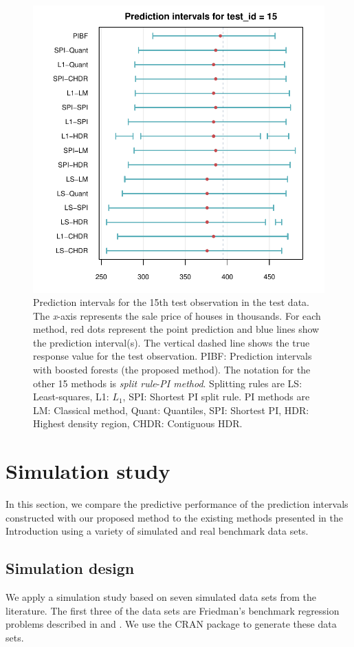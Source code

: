 \begin{figure}[htbp]
  \centering
  \includegraphics[scale=0.7]{pi_plot.pdf}
  \caption{Prediction intervals for the 15th test observation in the test data. The \emph{x}-axis represents the sale price of houses in thousands. For each method, red dots represent the point prediction and blue lines show the prediction interval(s). The vertical dashed line shows the true response value for the test observation. PIBF: Prediction intervals with boosted forests (the proposed method). The notation for the other 15 methods is \emph{split rule}-\emph{PI method}. Splitting rules are LS: Least-squares, L1: $L_1$, SPI: Shortest PI split rule. PI methods are LM: Classical method, Quant: Quantiles, SPI: Shortest PI, HDR: Highest density region, CHDR: Contiguous HDR.}
  \label{figure:piplot}
\end{figure}

\section{Simulation study}
In this section, we compare the predictive performance of the prediction intervals constructed with our proposed method to the existing methods presented in the Introduction using a variety of simulated and real benchmark data sets. 

\subsection{Simulation design}
We apply a simulation study based on seven simulated data sets from the literature. The first three of the data sets are Friedman's benchmark regression problems described in \citet{jerome_h_friedman_multivariate_1991} and \citet{breiman_bagging_1996}. We use the CRAN package  \citep{R-mlbench} to generate these data sets. 

